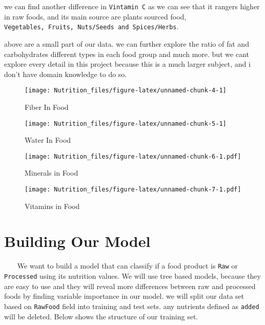 \documentclass[]{article}
\begin{document}
we can find another difference in \texttt{Vintamin\ C} as we can see
that it rangers higher in raw foods, and its main source are plants
sourced food,
\texttt{Vegetables,\ Fruits,\ Nuts/Seeds\ and\ Spices/Herbs}.

above are a small part of our data. we can further explore the ratio of
fat and carbohydrates different types in each food group and much more.
but we cant explore every detail in this project because this is a much
larger subject, and i don't have domain knowledge to do so.

\newpage

\begin{figure}

{\centering \texttt{[image: Nutrition\_files/figure-latex/unnamed-chunk-4-1]} 

}

\caption{Fiber In Food}\label{fig:unnamed-chunk-4}
\end{figure}

\begin{figure}

{\centering \texttt{[image: Nutrition\_files/figure-latex/unnamed-chunk-5-1]} 

}

\caption{Water In Food}\label{fig:unnamed-chunk-5}
\end{figure}

\newpage

\begin{figure}
\centering
\texttt{[image: Nutrition\_files/figure-latex/unnamed-chunk-6-1.pdf]}
\caption{Minerals in Food}
\end{figure}

\newpage

\begin{figure}
\centering
\texttt{[image: Nutrition\_files/figure-latex/unnamed-chunk-7-1.pdf]}
\caption{Vitamins in Food}
\end{figure}

\newpage

\hypertarget{building-our-model}{%
\section{Building Our Model}\label{building-our-model}}

~~~ We want to build a model that can classify if a food product is
\texttt{Raw} or \texttt{Processed} using its nutrition values. We will
use tree based models, because they are easy to use and they will reveal
more differences between raw and processed foods by finding variable
importance in our model. we will split our data set based on
\texttt{RawFood} field into training and test sets. any nutrients
defined as \texttt{added} will be deleted. Below shows the structure of
our training set.
\end{document}
